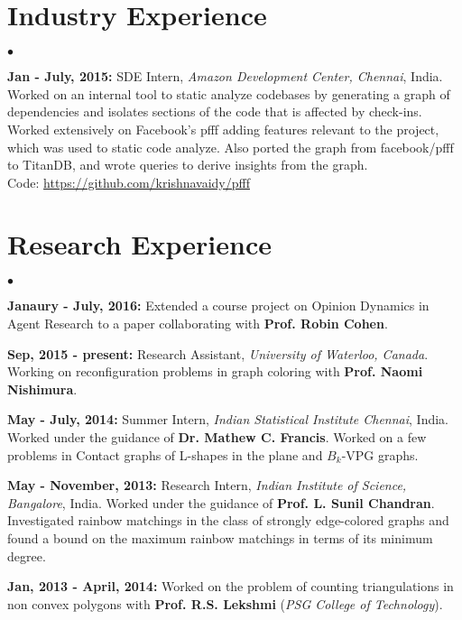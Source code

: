 \documentclass[margin,line]{res}
\newenvironment{list2}{
  \begin{list}{$\bullet$}{%
      \setlength{\itemsep}{0in}
      \setlength{\parsep}{0in} \setlength{\parskip}{0in}
      \setlength{\topsep}{0in} \setlength{\partopsep}{0in} 
      \setlength{\leftmargin}{0.2in}}}{\end{list}}
\begin{document}
\begin{resume}
\section{\sc Industry Experience}
\begin{list2}
\item \textbf{Jan - July, 2015:} SDE Intern, \textit{Amazon Development Center, Chennai}, India.  Worked on
an internal tool to static analyze codebases by generating a graph of dependencies and isolates
sections of the code that is affected by check-ins.  Worked extensively on Facebook's pfff adding features relevant to the project, which was used to static code analyze.  Also ported the graph from facebook/pfff to TitanDB, and wrote queries to derive insights from the graph. \\Code: \url{https://github.com/krishnavaidy/pfff}
\end{list2}

\section{\sc Research Experience}
\begin{list2}
\item \textbf{Janaury - July, 2016:} Extended a course project on Opinion
  Dynamics in Agent Research to a paper collaborating with \textbf{Prof. Robin Cohen}.
  
\item \textbf{Sep, 2015 - present:} Research Assistant, \textit{University of
    Waterloo, Canada}. Working on reconfiguration problems in graph coloring with \textbf{Prof. Naomi Nishimura}.

\item \textbf{May - July, 2014:} Summer Intern, \textit{Indian Statistical Institute Chennai}, India. Worked under the guidance of \textbf{Dr. Mathew C. Francis}. Worked on a few problems in Contact graphs of L-shapes in the plane and $B_{k}$-VPG graphs.

\item \textbf{May -  November, 2013:} Research Intern, \textit{Indian Institute of Science, Bangalore}, India. Worked under the guidance of \textbf{Prof. L. Sunil Chandran}. Investigated rainbow matchings in the class of strongly edge-colored graphs and found a bound on the maximum rainbow matchings in terms of its minimum degree.

\item \textbf{Jan, 2013 - April, 2014:} Worked on the problem of counting triangulations in non convex polygons with \textbf{Prof. R.S. Lekshmi} (\textit{PSG College of Technology}).


\end{list2}
\end{resume}
\end{document}
